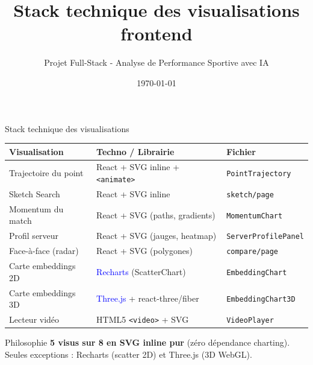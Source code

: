 \documentclass[11pt]{beamer}
\title[Visualisations]{Stack technique des visualisations frontend}
\subtitle{Projet Full-Stack - Analyse de Performance Sportive avec IA}
\institute[Projet Informatique]{Projet Informatique}
\date{\today}
\begin{document}
\begin{frame}{Stack technique des visualisations}
\begin{table}
\centering
\scriptsize
\begin{tabular}{|l|l|l|}
\hline
\textbf{Visualisation} & \textbf{Techno / Librairie} & \textbf{Fichier} \\
\hline
Trajectoire du point & React + SVG inline + \texttt{<animate>} & \texttt{PointTrajectory} \\
\hline
Sketch Search & React + SVG inline & \texttt{sketch/page} \\
\hline
Momentum du match & React + SVG (paths, gradients) & \texttt{MomentumChart} \\
\hline
Profil serveur & React + SVG (jauges, heatmap) & \texttt{ServerProfilePanel} \\
\hline
Face-à-face (radar) & React + SVG (polygones) & \texttt{compare/page} \\
\hline
Carte embeddings 2D & \textcolor{blue}{Recharts} (ScatterChart) & \texttt{EmbeddingChart} \\
\hline
Carte embeddings 3D & \textcolor{blue}{Three.js} + react-three/fiber & \texttt{EmbeddingChart3D} \\
\hline
Lecteur vidéo & HTML5 \texttt{<video>} + SVG & \texttt{VideoPlayer} \\
\hline
\end{tabular}
\end{table}

\begin{alertblock}{Philosophie}
\small
\textbf{5 visus sur 8 en SVG inline pur} (zéro dépendance charting).\\
Seules exceptions : Recharts (scatter 2D) et Three.js (3D WebGL).
\end{alertblock}
\end{frame}
\end{document}
